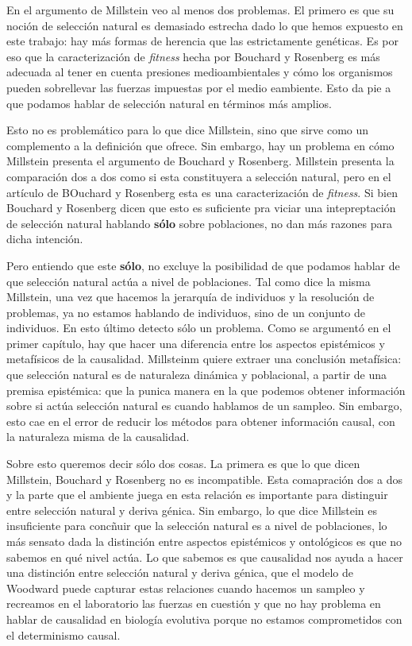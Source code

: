 En el argumento de Millstein veo al menos dos problemas. El primero es que su noción de selección natural es demasiado estrecha dado lo que hemos expuesto en este trabajo: hay más formas de herencia que las estrictamente genéticas. Es por eso que la caracterización de \emph{fitness} hecha por Bouchard y Rosenberg es más adecuada al tener en cuenta presiones medioambientales y cómo los organismos pueden sobrellevar las fuerzas impuestas por el medio eambiente. Esto da pie a que podamos hablar de selección natural en términos más amplios.

Esto no es problemático para lo que dice Millstein, sino que sirve como un complemento a la definición que ofrece. Sin embargo, hay un problema en cómo Millstein presenta el argumento de Bouchard y Rosenberg. Millstein presenta la comparación dos a dos como si esta constituyera a selección natural, pero en el artículo de BOuchard y Rosenberg esta es una caracterización de \emph{fitness}. Si bien Bouchard y Rosenberg dicen que esto es suficiente pra viciar una intepreptación de selección natural hablando \textbf{sólo} sobre poblaciones, no dan más razones para dicha intención.

Pero entiendo que este \textbf{sólo}, no excluye la posibilidad de que podamos hablar de que selección natural actúa a nivel de poblaciones. Tal como dice la misma Millstein, una vez que hacemos la jerarquía de individuos y la resolución de problemas, ya no estamos hablando de individuos, sino de un conjunto de individuos. En esto último detecto sólo un problema. Como se argumentó en el primer capítulo, hay que hacer una diferencia entre los aspectos epistémicos y metafísicos de la causalidad. Millsteinm quiere extraer una conclusión metafísica: que selección natural es de naturaleza dinámica y poblacional, a partir de una premisa epistémica: que la punica manera en la que podemos obtener información sobre si actúa selección natural es cuando hablamos de un sampleo. Sin embargo, esto cae en el error de reducir los métodos para obtener información causal, con la naturaleza misma de la causalidad.

Sobre esto queremos decir sólo dos cosas. La primera es que lo que dicen Millstein, Bouchard y Rosenberg no es incompatible. Esta comapración dos a dos y la parte que el ambiente juega en esta relación es importante para distinguir entre selección natural y deriva génica. Sin embargo, lo que dice Millstein es insuficiente para concñuir que la selección natural es a nivel de poblaciones, lo más sensato dada la distinción entre aspectos epistémicos y ontológicos es que no sabemos en qué nivel actúa. Lo que sabemos es que causalidad nos ayuda a hacer una distinción entre selección natural y deriva génica, que el modelo de Woodward puede capturar estas relaciones cuando hacemos un sampleo y recreamos en el laboratorio las fuerzas en cuestión y que no hay problema en hablar de causalidad en biología evolutiva porque no estamos comprometidos con el determinismo causal.




